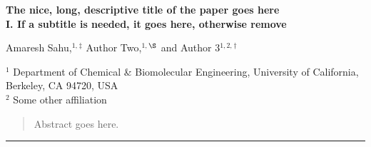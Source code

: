 \documentclass[11pt,twoside,notitlepage]{article}
\begin{document}

	\begin{center}
		{\textbf{
			\Large{The nice, long, descriptive title of the paper goes here}
		}} \\
		\vspace{0.11in}
		{\textbf{
			\large{I. If a subtitle is needed, it goes here, otherwise remove}
		}} \\
		\vspace{0.21in}

		{\small
			Amaresh Sahu,$^{1,}$\hyperlink{email1}{$^{\ddag}$}
			Author Two,$^{1,}$\hyperlink{email2}{$^{\S}$}
			and Author 3$^{1,2,}$\hyperlink{email3}{$^{\dag}$} \\
		}
		\vspace{0.25in}

		\footnotesize{
			{
				$^1$
				Department of Chemical \& Biomolecular Engineering,
				University of California, Berkeley, CA 94720, USA
				\\[3pt]
				$^2$
				Some other affiliation
				\\
			}
		}
	\end{center}



	\vspace{13pt}

	\begin{abstract}
		Abstract goes here.
		\lipsum[1]
	\end{abstract}
	\vspace{15pt}
				   



	\noindent\rule{4.6cm}{0.4pt}

	\small



	\vspace{25pt}

	{ \hypersetup{linkcolor=black} \tableofcontents }
	\vspace{20pt}




	








	
	
\end{document}
